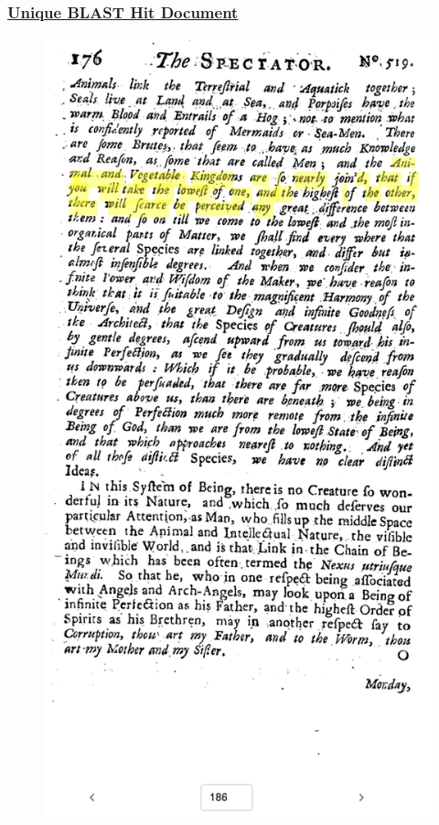 \documentclass[pdf]{beamer}
\begin{document}
\begin{frame}
  \frametitle{\href{https://gallica-kaiku.rahtiapp.fi/?eccoId=1702800107&offsetStart=357168&offsetEnd=357338}{Unique BLAST Hit Document}}
  \begin{figure}[]
    \centering
    \includegraphics[width=\linewidth,height=\textheight,keepaspectratio]{images/blast_hit.png}
  \end{figure}
\end{frame}
\end{document}
